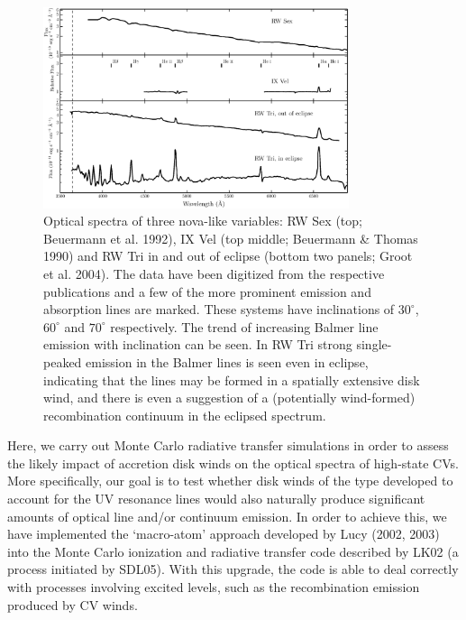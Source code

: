 \documentclass[preprint, a4paper, 11pt]{aastex}
\begin{document}
\begin{figure}	%
\centering
\includegraphics[width=0.8\textwidth]{figures/fig1.eps}
\caption{Optical spectra of three nova-like variables: 
RW Sex (top; Beuermann et al. 1992),
IX Vel (top middle; Beuermann \& Thomas 1990) 
and RW Tri in and out of eclipse (bottom two panels; Groot et al. 2004).
The data have been digitized from the respective publications and a few of the more
prominent emission and absorption lines are marked. 
These systems have inclinations of $30^\circ$, $60^\circ$ and $70^\circ$ 
respectively.
The trend of increasing Balmer line emission with inclination can be seen.
In RW Tri strong single-peaked emission in the Balmer lines is seen even
in eclipse, indicating that the lines may be formed in a spatially
extensive disk wind, and there is even a suggestion 
of a (potentially wind-formed) recombination continuum in the eclipsed
spectrum.}
\label{novalikes}
\end{figure}

\nocite{groot2004}
\nocite{beuermann1990}
\nocite{beuermann1992}

Here, we carry out Monte Carlo radiative transfer simulations in
order to assess the likely impact of accretion disk winds on the
optical spectra of high-state CVs. More specifically, our goal is to
test whether disk winds of the type developed to account for the UV
resonance lines would also naturally produce significant amounts of  
optical line and/or continuum emission. In order to achieve this, we
have implemented the `macro-atom' approach developed by Lucy
(2002, 2003) into the Monte Carlo ionization and radiative transfer
code described by LK02 (a process initiated by SDL05). With this
upgrade, the code is able to deal correctly with processes involving
excited levels, such as the recombination emission produced by CV
winds. 
\end{document}
